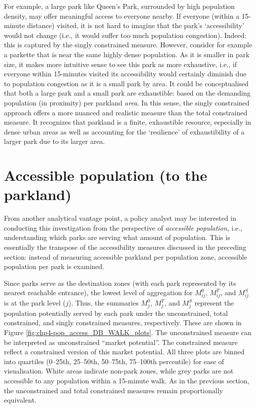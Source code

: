 \documentclass[
11pt, %
oneside, %
english, %
singlespacing, %
]{macthesis} %
\begin{document}
For example, a large park like Queen's Park, surrounded by high population density, may offer meaningful access to everyone nearby. If everyone (within a 15-minute distance) visited, it is not hard to imagine that the park's `accessibility' would not change (i.e., it would suffer too much population congestion). Indeed: this is captured by the singly constrained measure. However, consider for example a parkette that is near the same highly dense population. As it is smaller in park size, it makes more intuitive sense to see this park as more exhaustive, i.e., if everyone within 15-minutes visited its accessibility would certainly diminish due to population congestion as it is a small park by area. It could be conceptualised that both a large park and a small park are exhaustible: based on the demanding population (in proximity) per parkland \emph{area}. In this sense, the singly constrained approach offers a more nuanced and realistic measure than the total constrained measure. It recognizes that parkland is a finite, exhaustible resource, especially in dense urban areas as well as accounting for the `resilience' of exhaustibility of a larger park due to its larger area.

\section{Accessible population (to the parkland)}\label{sec:accessible-pop}

From another analytical vantage point, a policy analyst may be interested in conducting this investigation from the perspective of \emph{accessible population}, i.e., understanding which parks are serving what amount of population. This is essentially the transpose of the accessibility measures discussed in the preceding section: instead of measuring accessible parkland per population zone, accessible population per park is examined.

Since parks serve as the destination zones (with each park represented by its nearest reachable entrance), the lowest level of aggregation for \(M^0_{ij}\), \(M^T_{ij}\), and \(M^S_{ij}\) is at the park level (\(j\)). Thus, the summaries \(M^0_j\), \(M^T_j\), and \(M^S_j\) represent the population potentially served by each park under the unconstrained, total constrained, and singly constrained measures, respectively. These are shown in Figure \ref{fig:chp4-pop_access_DB_WALK_plots}. The unconstrained measure can be interpreted as unconstrained ``market potential''. The constrained measure reflect a constrained version of this market potential. All three plots are binned into quartiles (0--25th, 25--50th, 50--75th, 75--100th percentile) for ease of visualisation. White areas indicate non-park zones, while grey parks are not accessible to any population within a 15-minute walk. As in the previous section, the unconstrained and total constrained measures remain proportionally equivalent.
\end{document}
